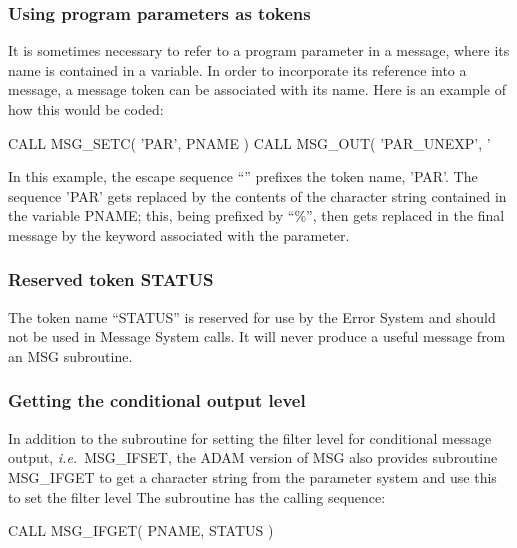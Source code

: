 \documentclass[twoside,11pt]{starlink}
\begin{document}
\subsubsection{Using program parameters as tokens}

It is sometimes necessary to refer to a program parameter in a message, where
its name is contained in a variable.
In order to incorporate its reference into a message, a message token can be
associated with its name.
Here is an example of how this would be coded:

\begin {small}
\begin{terminalv}
CALL MSG_SETC( 'PAR', PNAME )
CALL MSG_OUT( 'PAR_UNEXP', '%
\end{terminalv}
\end {small}

In this example, the escape sequence ``\wedge'' prefixes the token name,
'PAR'.
The sequence '\wedge PAR' gets replaced by the contents of the character
string contained in the variable PNAME; this, being prefixed by ``\%'', then
gets replaced in the final message by the keyword associated with the
parameter.


\subsubsection{Reserved token STATUS}

The token name ``STATUS'' is reserved for use by the Error System and should
not be used in Message System calls. It will never produce a useful message
from an MSG subroutine.


\subsubsection{Getting the conditional output level}

In addition to the subroutine for setting the filter level for conditional
message output, \textit{i.e.}\ MSG\_IFSET, the ADAM version of MSG also provides
subroutine MSG\_IFGET to get a character string from the parameter system and
use this to set the filter level
The subroutine has the calling sequence:

\begin {small}
\begin{terminalv}
CALL MSG_IFGET( PNAME, STATUS )
\end{terminalv}
\end {small}
\end{document}
